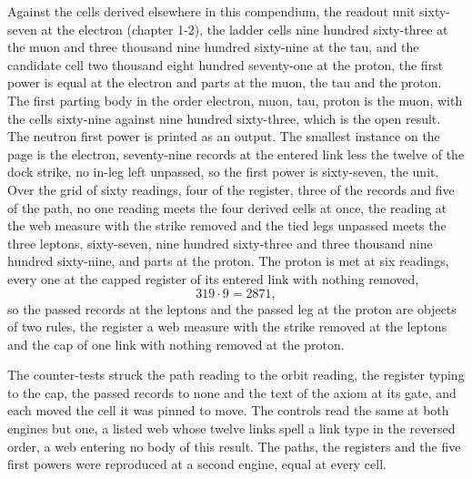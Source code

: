 \begin{chproof}[exact]
Against the cells derived elsewhere in this compendium, the readout unit sixty-seven at the electron (chapter 1-2), the ladder cells nine hundred sixty-three at the muon and three thousand nine hundred sixty-nine at the tau, and the candidate cell two thousand eight hundred seventy-one at the proton, the first power is equal at the electron and parts at the muon, the tau and the proton. The first parting body in the order electron, muon, tau, proton is the muon, with the cells sixty-nine against nine hundred sixty-three, which is the open result. The neutron first power is printed as an output. The smallest instance on the page is the electron, seventy-nine records at the entered link less the twelve of the dock strike, no in-leg left unpassed, so the first power is sixty-seven, the unit. Over the grid of sixty readings, four of the register, three of the records and five of the path, no one reading meets the four derived cells at once, the reading at the web measure with the strike removed and the tied legs unpassed meets the three leptons, sixty-seven, nine hundred sixty-three and three thousand nine hundred sixty-nine, and parts at the proton. The proton is met at six readings, every one at the capped register of its entered link with nothing removed,
\begin{equation}
319\cdot 9 = 2871 ,
\end{equation}
so the passed records at the leptons and the passed leg at the proton are objects of two rules, the register a web measure with the strike removed at the leptons and the cap of one link with nothing removed at the proton.

The counter-tests struck the path reading to the orbit reading, the register typing to the cap, the passed records to none and the text of the axiom at its gate, and each moved the cell it was pinned to move. The controls read the same at both engines but one, a listed web whose twelve links spell a link type in the reversed order, a web entering no body of this result. The paths, the registers and the five first powers were reproduced at a second engine, equal at every cell.
\end{chproof}
